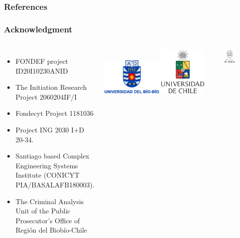 \documentclass[aspectratio=169]{beamer}
\begin{document}
\begin{frame}[allowframebreaks]
  \frametitle{References}
  \footnotesize
  
\end{frame}

\begin{frame}
\frametitle{Acknowledgment}
\begin{columns}
\begin{itemize}
\item FONDEF project ID20I10230ANID
\item The Initiation Research Project 2060204IF/I
\item Fondecyt Project 1181036
\item Project ING 2030 I+D 20-34.
\item Santiago based Complex Engineering Systems Institute (CONICYT PIA/BASALAFB180003).
\item The Criminal Analysis Unit of the Public Prosecutor's Office of Región del Biobío-Chile
\end{itemize}
\centering
\includegraphics[width=0.5\textwidth]{logos/ubb}
\includegraphics[width=0.4\textwidth]{logos/uchile}
\vspace{0.5\baselineskip}

\includegraphics[width=0.45\textwidth]{logos/uandes}
\end{columns}
\end{frame}

\begin{frame}
  \titlepage
\end{frame}
\end{document}
